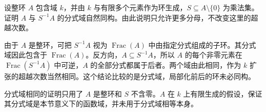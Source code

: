 \begin{exercise}\label{b1:ex:14-14}
	设整环 \(A\) 包含域 \(k\)，并由 \(k\) 与有限多个元素作为环生成，\(S\subseteq A\setminus\{0\}\) 为乘法集。证明 \(A\) 与 \(S^{-1}A\) 的分式域自然同构。由此说明只允许更多分母，不改变这里的超越次数。
\end{exercise}
\begin{solution}
	由于 \(A\) 是整环，可把 \(S^{-1}A\) 视为 \(\operatorname{Frac}(A)\) 中由指定分式组成的子环。其分式域因此包含于 \(\operatorname{Frac}(A)\)。反方向，\(A\subseteq S^{-1}A\)，所以 \(A\) 的每个非零元素在 \(\operatorname{Frac}(S^{-1}A)\) 中可逆，\(A\) 的全部分式都属于后者。两个域由此相同，作为 \(k\) 扩张的超越次数当然相同。这个结论比较的是分式域，局部化前后的环未必同构。

	分式域相同的证明只用了 \(A\) 是整环和 \(S\) 不含零。\(A\) 在 \(k\) 上有限生成的假设，保证其分式域是本节意义下的函数域，并未用于分式域相等本身。
\end{solution}
